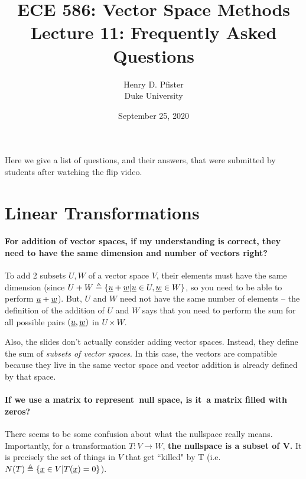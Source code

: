 \documentclass[10pt,english]{article}
\begin{document}
\title{ECE 586: Vector Space Methods \\ Lecture 11: Frequently Asked Questions}
\author{Henry D. Pfister \\ Duke University}
\date{September 25, 2020}

\maketitle

Here we give a list of questions, and their answers, that were submitted by students after watching the flip video.

\section{Linear Transformations}

\paragraph{For addition of vector spaces, if my understanding is correct, they need to have the same dimension and number of vectors right?}

To add 2 subsets $U, W$ of a vector space $V$, their elements must have the same dimension (since $U+W \triangleq \{\underline{u}+\underline{w}| \underline{u}\in U, \underline{w}\in W\}$, so you need to be able to perform $\underline{u}+\underline{w}$).
But, $U$ and $W$ need not have the same number of elements -- the definition of the addition of $U$ and $W$ says that you need to perform the sum for all possible pairs $(\underline{u},\underline{w})$ in $U\times W$.

Also, the slides don't actually consider adding vector spaces.
Instead, they define the sum of \emph{subsets of vector spaces}.
In this case, the vectors are compatible because they live in the same vector space and vector addition is already defined by that space.




\paragraph{If we use a matrix to represent null space, is it a matrix filled with zeros?}
There seems to be some confusion about what the nullspace really means.
Importantly, for a transformation $T: V \rightarrow W$, \textbf{the nullspace is a subset of V.} It is precisely the set of things in $V$ that get ``killed" by T (i.e. $N(T) \triangleq \{\underline{x}\in V| T(\underline{x}) = 0\}$).
\end{document}
